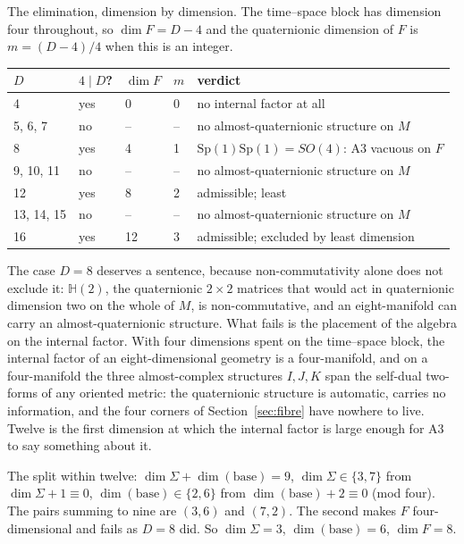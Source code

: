 \documentclass[11pt,a4paper]{article}
\theoremstyle{plain}
\theoremstyle{definition}
\theoremstyle{remark}
\newcommand{\Hquat}{\mathbb{H}}
\begin{document}
The elimination, dimension by dimension. The time--space block has dimension four throughout, so $\dim F=D-4$ and the quaternionic dimension of $F$ is $m=(D-4)/4$ when this is an integer.

\begin{center}
\begin{tabular}{lllll}
\toprule
$D$ & $4\mid D$? & $\dim F$ & $m$ & verdict\\
\midrule
4 & yes & 0 & 0 & no internal factor at all\\
5, 6, 7 & no & -- & -- & no almost-quaternionic structure on $M$\\
8 & yes & 4 & 1 & $\mathrm{Sp}(1)\mathrm{Sp}(1)=SO(4)$: A3 vacuous on $F$\\
9, 10, 11 & no & -- & -- & no almost-quaternionic structure on $M$\\
12 & yes & 8 & 2 & admissible; least\\
13, 14, 15 & no & -- & -- & no almost-quaternionic structure on $M$\\
16 & yes & 12 & 3 & admissible; excluded by least dimension\\
\bottomrule
\end{tabular}
\end{center}

The case $D=8$ deserves a sentence, because non-commutativity alone does not exclude it: $\Hquat(2)$, the quaternionic $2\times2$ matrices that would act in quaternionic dimension two on the whole of $M$, is non-commutative, and an eight-manifold can carry an almost-quaternionic structure. What fails is the placement of the algebra on the internal factor. With four dimensions spent on the time--space block, the internal factor of an eight-dimensional geometry is a four-manifold, and on a four-manifold the three almost-complex structures $I,J,K$ span the self-dual two-forms of any oriented metric: the quaternionic structure is automatic, carries no information, and the four corners of Section~\ref{sec:fibre} have nowhere to live. Twelve is the first dimension at which the internal factor is large enough for A3 to say something about it.

The split within twelve: $\dim\Sigma+\dim(\text{base})=9$, $\dim\Sigma\in\{3,7\}$ from $\dim\Sigma+1\equiv0$, $\dim(\text{base})\in\{2,6\}$ from $\dim(\text{base})+2\equiv0$ (mod four). The pairs summing to nine are $(3,6)$ and $(7,2)$. The second makes $F$ four-dimensional and fails as $D=8$ did. So $\dim\Sigma=3$, $\dim(\text{base})=6$, $\dim F=8$.
\end{document}
